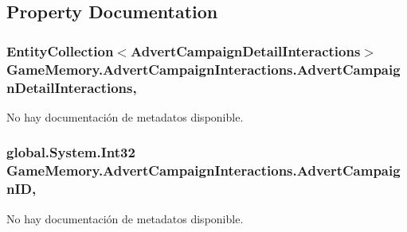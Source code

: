 \subsection{Property Documentation}
\hypertarget{class_game_memory_1_1_advert_campaign_interactions_a76c26241b44be34ad0751c279509b2f3}{
\subsubsection[{Advert\-Campaign\-Detail\-Interactions}]{\setlength{\rightskip}{0pt plus 5cm}Entity\-Collection$<${\bf Advert\-Campaign\-Detail\-Interactions}$>$ Game\-Memory.\-Advert\-Campaign\-Interactions.\-Advert\-Campaign\-Detail\-Interactions\hspace{0.3cm}{\ttfamily [get]}, {\ttfamily [set]}}}\label{class_game_memory_1_1_advert_campaign_interactions_a76c26241b44be34ad0751c279509b2f3}


No hay documentación de metadatos disponible. 

\hypertarget{class_game_memory_1_1_advert_campaign_interactions_a1f5ba2d040aee7f7c01dcec6e48cf4d0}{
\subsubsection[{Advert\-Campaign\-I\-D}]{\setlength{\rightskip}{0pt plus 5cm}global.\-System.\-Int32 Game\-Memory.\-Advert\-Campaign\-Interactions.\-Advert\-Campaign\-I\-D\hspace{0.3cm}{\ttfamily [get]}, {\ttfamily [set]}}}\label{class_game_memory_1_1_advert_campaign_interactions_a1f5ba2d040aee7f7c01dcec6e48cf4d0}


No hay documentación de metadatos disponible. 

